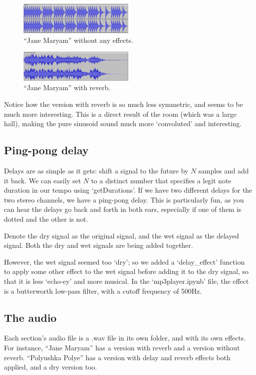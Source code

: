 \documentclass[12pt]{article}
\begin{document}
\begin{figure}[h!]
    \centering
    \includegraphics[width=0.5\textwidth]{dry maryam.JPG}
    \caption{``Jane Maryam'' without any effects.}
    \label{dryMaryam}
\end{figure}
\begin{figure}[h!]
    \centering
    \includegraphics[width=0.5\textwidth]{wet maryam.JPG}
    \caption{``Jane Maryam'' with reverb.}
    \label{wetMaryam}
\end{figure}

Notice how the version with reverb is so much less symmetric, and seems to be much more interesting.
This is a direct result of the room (which was a large hall), making the pure sinusoid sound 
much more `convoluted' and interesting.

\pagebreak

\subsection{Ping-pong delay}
Delays are as simple as it gets: shift a signal to the future by $N$ samples and add it back.
We can easily set $N$ to a distinct number that specifies a legit note duration in our tempo
using `getDurations'. If we have two different delays for the two stereo channels, we have a 
ping-pong delay. This is particularly fun, as you can hear the delays go back and forth in
both ears, especially if one of them is dotted and the other is not.

Denote the dry signal as the original signal, and the wet signal as the delayed signal. Both the dry
and wet signals are being added together.

However, the wet signal seemed too `dry'; so we added a `delay\_effect' function to apply some other effect
to the wet signal before adding it to the dry signal, so that it is less `echo-ey' and more musical.
In the `mp3player.ipynb' file, the effect is a butterworth low-pass filter, with a cutoff frequency of
500Hz.

\subsection{The audio}
Each section's audio file is a .wav file in its own folder, and with its own effects. For instance,
``Jane Maryam'' has a version with reverb and a version without reverb. ``Polyushka Polye'' has a version
with delay and reverb effects both applied, and a dry version too.
\end{document}
